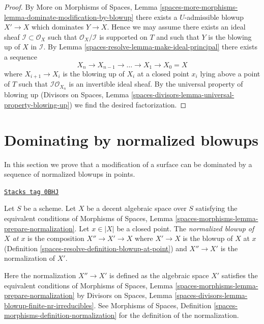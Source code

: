 \begin{proof}
By More on Morphisms of Spaces,
Lemma \ref{spaces-more-morphisms-lemma-dominate-modification-by-blowup}
there exists a $U$-admissible blowup $X' \to X$ which dominates
$Y \to X$. Hence we may assume there exists an ideal sheaf
$\mathcal{I} \subset \mathcal{O}_X$ such that
$\mathcal{O}_X/\mathcal{I}$ is supported on $T$ and such that
$Y$ is the blowing up of $X$ in $\mathcal{I}$.
By Lemma \ref{spaces-resolve-lemma-make-ideal-principal}
there exists a sequence
$$
X_n \to X_{n - 1} \to \ldots \to X_1 \to X_0 = X
$$
where $X_{i + 1} \to X_i$ is the blowing up of $X_i$ at a closed
point $x_i$ lying above a point of $T$ such that
$\mathcal{I}\mathcal{O}_{X_n}$ is an invertible ideal sheaf.
By the universal property of blowing up
(Divisors on Spaces, Lemma
\ref{spaces-divisors-lemma-universal-property-blowing-up})
we find the desired factorization.
\end{proof}

\section{Dominating by normalized blowups}
\label{spaces-resolve-section-normalized-blowups}
In this section we prove that a modification of a surface can be dominated
by a sequence of normalized blowups in points.

\begin{definition}
\label{spaces-resolve-definition-normalized-blowup}
\href{https://stacks.math.columbia.edu/tag/0BHJ}{\texttt{Stacks tag 0BHJ}}

Let $S$ be a scheme. Let $X$ be a decent algebraic space over $S$ satisfying
the equivalent conditions of
Morphisms of Spaces, Lemma \ref{spaces-morphisms-lemma-prepare-normalization}.
Let $x \in |X|$ be a closed point. The {\it normalized blowup of $X$ at $x$}
is the composition $X'' \to X' \to X$ where $X' \to X$ is the blowup
of $X$ at $x$ (Definition \ref{spaces-resolve-definition-blowup-at-point})
and $X'' \to X'$ is the normalization of $X'$.
\end{definition}

Here the normalization $X'' \to X'$ is defined as the algebraic space
$X'$ satisfies the equivalent conditions of
Morphisms of Spaces, Lemma \ref{spaces-morphisms-lemma-prepare-normalization}
by
Divisors on Spaces, Lemma
\ref{spaces-divisors-lemma-blowup-finite-nr-irreducibles}.
See Morphisms of Spaces, Definition
\ref{spaces-morphisms-definition-normalization}
for the definition of the normalization.

